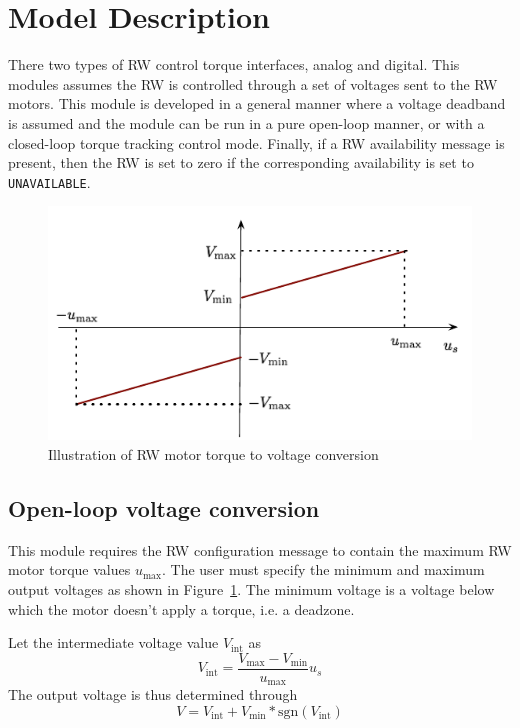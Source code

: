 \section{Model Description}
There two types of RW control torque interfaces, analog and digital. This modules assumes the RW is controlled through a set of voltages sent to the RW motors.  This module is developed in a general manner where a voltage deadband is assumed and the module can be run in a pure open-loop manner, or with a closed-loop torque tracking control mode.  Finally, if a RW availability message is present, then the RW is set to zero if the corresponding availability is set to {\tt UNAVAILABLE}. 



\begin{figure}[htb]
	\centerline{
		\includegraphics[]{Figures/us2V}
	}
	\caption{Illustration of RW motor torque to voltage conversion}
	\label{fig:us2V}
\end{figure}
\subsection{Open-loop voltage conversion}
This module requires the RW configuration message to contain the maximum RW motor torque values $u_{\text{max}}$.  The user must specify the minimum and maximum output voltages as shown in Figure~\ref{fig:us2V}.  The minimum voltage is a voltage below which the motor doesn't apply a torque, i.e. a deadzone.  

Let the intermediate voltage value $V_{\text{int}}$ as
\begin{equation}
\label{eq:rwMV:1}
V_{\text{int}} = \frac{V_{\text{max}} - V_{\text{min}}}{u_{\text{max}}} u_{s}
\end{equation}
The output voltage is thus determined through
\begin{equation}
V = V_{\text{int}} + V_{\text{min}} *\text{sgn}(V_{\text{int}} )
\end{equation}

